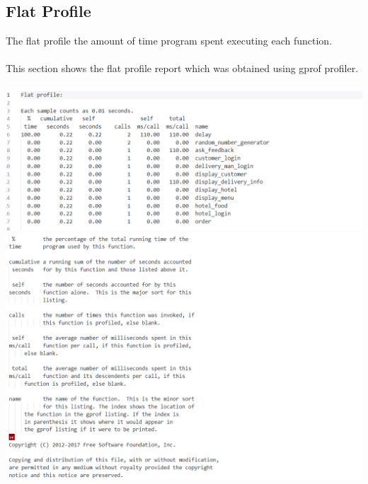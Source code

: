 \documentclass[12pt]{article}
\begin{document}
\subsection{Flat Profile}
The flat profile the amount of time program spent executing each function.\\
\\
This section shows the flat profile report which was obtained using gprof profiler.\\
\\
\includegraphics{profile_1.png}\\
\includegraphics{profile_2.png}\\
\end{document}
